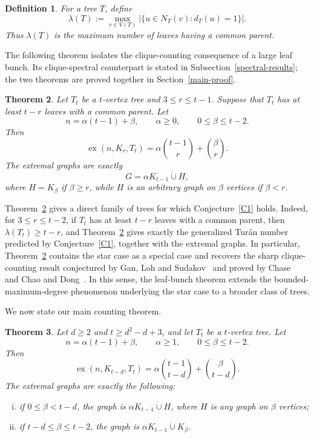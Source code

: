 \documentclass[11pt,a4paper]{article}
\newtheorem{theorem}{Theorem}[section]
\newtheorem{definition}[theorem]{Definition}
\newcommand{\ex}{\operatorname{ex}}
\newcommand{\dunion}{\mathbin{\dot\cup}}
\begin{document}
\begin{definition}\label{leaf-bunch-parameter}
For a tree $T$, define
\[
\lambda(T):=\max_{v\in V(T)}|\{u\in N_T(v):d_T(u)=1\}|.
\]
Thus $\lambda(T)$ is the maximum number of leaves having a common parent.
\end{definition}


The following theorem isolates the clique-counting consequence of a large leaf bunch. Its clique-spectral counterpart is stated in Subsection~\ref{spectral-results}; the two theorems are proved together in Section~\ref{main-proof}.

\begin{theorem}\label{leaf-bunch-counting-theorem}
Let $T_t$ be a $t$-vertex tree and $3\le r\le t-1$. Suppose that $T_t$ has at least $t-r$ leaves with a common parent.
Let
\[
n=\alpha(t-1)+\beta,
\qquad \alpha\ge0,
\qquad 0\le\beta\le t-2.
\]
Then
\begin{equation}\label{leaf-bunch-counting}
\ex(n,K_r,T_t)
=
\alpha\binom{t-1}{r}+\binom{\beta}{r}.
\end{equation}
The extremal graphs are exactly
\[
G=\alpha K_{t-1}\dunion H,
\]
where $H=K_\beta$ if $\beta\ge r$, while $H$ is an arbitrary graph on $\beta$ vertices if $\beta<r$.
\end{theorem}

Theorem~\ref{leaf-bunch-counting-theorem} gives a direct family of trees for which Conjecture~\ref{C1} holds. Indeed, for  $3\le r\le t-2$, if $T_t$ has at least $t-r$ leaves with a common parent, then $\lambda(T_t)\ge t-r$, and Theorem~\ref{leaf-bunch-counting-theorem} gives exactly the generalized Tur\'{a}n number predicted by Conjecture~\ref{C1}, together with the extremal graphs.  In particular, Theorem~\ref{leaf-bunch-counting-theorem} contains the star case as a special case and recovers the sharp clique-counting result conjectured by Gan, Loh and Sudakov~\cite{gan2015maximizing} and proved by Chase~\cite{chase2020} and Chao and Dong~\cite{Chao2022}. In this sense, the leaf-bunch theorem extends the bounded-maximum-degree phenomenon underlying the star case to a broader class of trees.

We now state our main counting theorem.

\begin{theorem}\label{T5}
Let \(d\ge 2\) and \(t\ge d^2-d+3\), and let \(T_t\) be a \(t\)-vertex tree. Let
\[
n=\alpha(t-1)+\beta,
\qquad \alpha\ge1,
\qquad 0\le\beta\le t-2.
\]
Then
\[
\ex(n,K_{t-d},T_t)
=\alpha\binom{t-1}{t-d}+\binom{\beta}{t-d}.
\]
The extremal graphs are exactly the following:
\begin{enumerate}[(i)]
\item if \(0\le\beta<t-d\), the graph is \(\alpha K_{t-1}\dunion H\), where \(H\) is any graph on \(\beta\) vertices;
\item if \(t-d\le\beta\le t-2\), the graph is \(\alpha K_{t-1}\dunion K_\beta\).
\end{enumerate}
\end{theorem}
\end{document}
